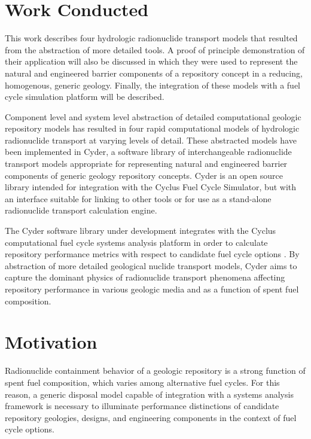 \documentclass[letterpaper]{article}
\begin{document}
\section{Work Conducted}

This work describes four hydrologic radionuclide transport models that resulted from 
the abstraction of more detailed tools. A proof of principle demonstration of their 
application will also be discussed in which they were used to represent 
the natural and engineered barrier components of a repository concept in a 
reducing, homogenous, generic geology. Finally, the integration of these models 
with a fuel cycle simulation platform will be described.

Component level and system level abstraction of detailed computational geologic 
repository models has resulted in four rapid computational models of 
hydrologic radionuclide transport at varying levels of detail. These abstracted 
models have been implemented in Cyder, a software library of interchangeable 
radionuclide transport models appropriate for representing natural and 
engineered barrier components of generic geology repository concepts.
Cyder is an open source library intended for integration with the 
Cyclus Fuel Cycle Simulator, but with an interface suitable for linking to other 
tools or for use as a stand-alone radionuclide transport calculation engine. 

The Cyder software library under development integrates with 
the Cyclus computational fuel cycle systems analysis platform in order to 
calculate repository performance metrics with respect to candidate fuel cycle 
options \cite{huff_cyder_2012,huff_cyclus:_2010}. By abstraction of more 
detailed geological nuclide transport models, Cyder aims to capture the dominant 
physics of radionuclide transport phenomena affecting repository performance in 
various geologic media and as a function of spent fuel composition.

\section{Motivation}
Radionuclide containment behavior of a geologic repository is a strong function 
of spent fuel composition, which varies among alternative fuel cycles. For this 
reason, a generic disposal model capable of integration with a systems analysis 
framework is necessary to illuminate performance distinctions of candidate 
repository geologies, designs, and engineering components in the context of fuel 
cycle options. 
\end{document}
